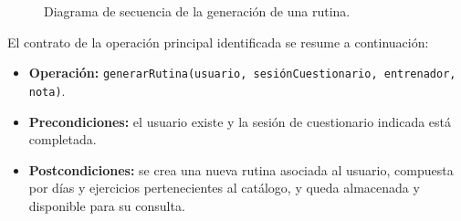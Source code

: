 \begin{figure}[ht]
\centering
\caption{Diagrama de secuencia de la generación de una rutina.}
\label{fig:secuencia}
\end{figure}

El contrato de la operación principal identificada se resume a continuación:

\begin{itemize}
    \item \textbf{Operación:} \texttt{generarRutina(usuario, sesiónCuestionario, entrenador, nota)}.
    \item \textbf{Precondiciones:} el usuario existe y la sesión de cuestionario indicada está completada.
    \item \textbf{Postcondiciones:} se crea una nueva rutina asociada al usuario, compuesta por días y ejercicios pertenecientes al catálogo, y queda almacenada y disponible para su consulta.
\end{itemize}
